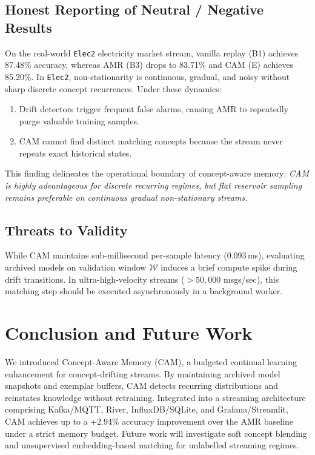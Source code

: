 \documentclass[conference]{IEEEtran}
\begin{document}
\subsection{Honest Reporting of Neutral / Negative Results}
On the real-world \texttt{Elec2} electricity market stream, vanilla replay (B1) achieves 87.48\% accuracy, whereas AMR (B3) drops to 83.71\% and CAM (E) achieves 85.20\%. In \texttt{Elec2}, non-stationarity is continuous, gradual, and noisy without sharp discrete concept recurrences. Under these dynamics:
\begin{enumerate}
    \item Drift detectors trigger frequent false alarms, causing AMR to repeatedly purge valuable training samples.
    \item CAM cannot find distinct matching concepts because the stream never repeats exact historical states.
\end{enumerate}
This finding delineates the operational boundary of concept-aware memory: \textit{CAM is highly advantageous for discrete recurring regimes, but flat reservoir sampling remains preferable on continuous gradual non-stationary streams.}

\subsection{Threats to Validity}
While CAM maintains sub-millisecond per-sample latency (0.093\,ms), evaluating archived models on validation window $\mathcal{W}$ induces a brief compute spike during drift transitions. In ultra-high-velocity streams ($>50,000$ msgs/sec), this matching step should be executed asynchronously in a background worker.

\section{Conclusion and Future Work}
We introduced Concept-Aware Memory (CAM), a budgeted continual learning enhancement for concept-drifting streams. By maintaining archived model snapshots and exemplar buffers, CAM detects recurring distributions and reinstates knowledge without retraining. Integrated into a streaming architecture comprising Kafka/MQTT, River, InfluxDB/SQLite, and Grafana/Streamlit, CAM achieves up to a +2.94\% accuracy improvement over the AMR baseline under a strict memory budget. Future work will investigate soft concept blending and unsupervised embedding-based matching for unlabelled streaming regimes.
\end{document}
